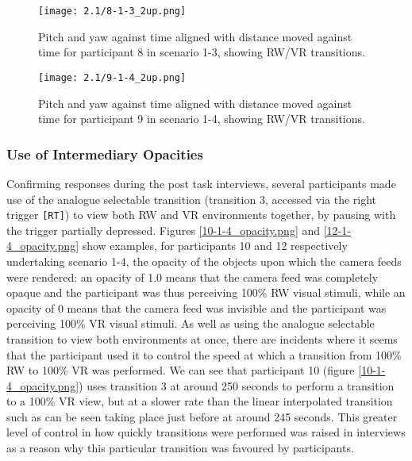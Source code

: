 \begin{figure}[h]
	\begin{center}
	\texttt{[image: 2.1/8-1-3\_2up.png]}
	\caption{Pitch and yaw against time aligned with distance moved against time for participant 8 in scenario 1-3, showing RW/VR transitions.}
	\label{8-1-3_2up.png}
	\end{center}
\end{figure}

\begin{figure}[h]
	\begin{center}
	\texttt{[image: 2.1/9-1-4\_2up.png]}
	\caption{Pitch and yaw against time aligned with distance moved against time for participant 9 in scenario 1-4, showing RW/VR transitions.}
	\label{9-1-4_2up.png}
	\end{center}
\end{figure}


\subsubsection{Use of Intermediary Opacities}

Confirming responses during the post task interviews, several participants made use of the analogue selectable transition (transition 3, accessed via the right trigger \texttt{[RT]}) to view both RW and VR environments together, by pausing with the trigger partially depressed. Figures \ref{10-1-4_opacity.png} and \ref{12-1-4_opacity.png} show examples, for participants 10 and 12 respectively undertaking scenario 1-4, the opacity of the objects upon which the camera feeds were rendered: an opacity of 1.0 means that the camera feed was completely opaque and the participant was thus perceiving 100\% RW visual stimuli, while an opacity of 0 means that the camera feed was invisible and the participant was perceiving 100\% VR visual stimuli. As well as using the analogue selectable transition to view both environments at once, there are incidents where it seems that the participant used it to control the speed at which a transition from 100\% RW to 100\% VR was performed. We can see that participant 10 (figure \ref{10-1-4_opacity.png}) uses transition 3 at around 250 seconds to perform a transition to a 100\% VR view, but at a slower rate than the linear interpolated transition such as can be seen taking place just before at around 245 seconds. This greater level of control in how quickly transitions were performed was raised in interviews as a reason why this particular transition was favoured by participants.

